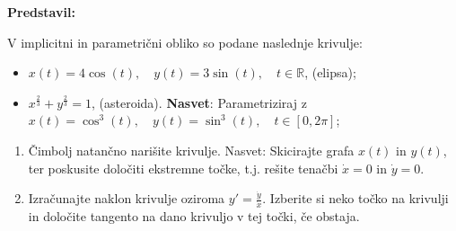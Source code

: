 \textbf{Predstavil:}

V implicitni in parametrični obliko so podane naslednje krivulje:
		\begin{itemize}
				\item $ x(t) = 4\cos(t), \quad y(t) = 3\sin(t), \quad t \in \mathbb{R}$, (elipsa);
				\item $ x^{\frac{2}{3}} + y^{\frac{2}{3}} = 1$, (asteroida). \textbf{Nasvet}: Parametriziraj z $ x(t) = \cos^3(t), \quad y(t) = \sin^3(t), \quad t \in [0,2\pi] $;
		\end{itemize}
		\begin{enumerate}
			\item Čimbolj natančno narišite krivulje. Nasvet: Skicirajte grafa $x(t)$ in $y(t)$, ter poskusite določiti ekstremne točke, t.j. rešite tenačbi $\dot{x} =0$ in $\dot{y}=0$.
			\item Izračunajte naklon krivulje oziroma $y'=\frac{\dot{y}}{\dot{x}}$. Izberite si neko točko na krivulji in določite tangento na dano krivuljo v tej točki, če obstaja.
		\end{enumerate}